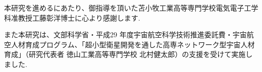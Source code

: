 \begin{acknowledgment}\label{acknowledgment}


本研究を進めるにあたり、御指導を頂いた苫小牧工業高等専門学校電気電子工学科准教授工藤彰洋博士に心より感謝します. 

また本研究は、文部科学省・平成29
年度宇宙航空科学技術推進委託費・宇宙航空人材育成プログラム、「超小型衛星開発を通した高専ネットワーク型宇宙人材育成」（研究代表者
徳山工業高等専門学校 北村健太郎）の支援を受けて実施しました. 

\end{acknowledgment}